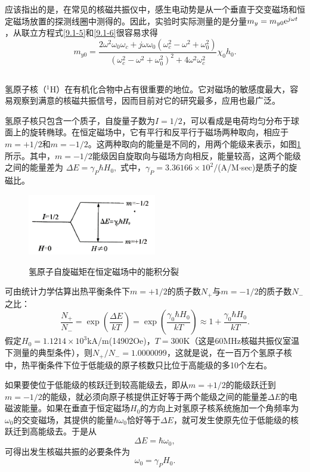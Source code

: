 \documentclass[a4paper]{article}
\begin{document}
应该指出的是，在常见的核磁共振仪中，感生电动势是从一个垂直于交变磁场和恒定磁场放置的探测线圈中测得的。因此，实验时实际测量的是分量$m_y=m_{y0}{\rm e}^{j\omega t}$，从联立方程式\ref{9.1-5}和\ref{9.1-6}很容易求得
\begin{equation}m_{y0}=\frac{2\omega^2\omega_0\omega_c+j\omega\omega_0(\omega_c^2-\omega^2+\omega_0^2)}{(\omega_c^2-\omega^2+\omega_0^2)^2+4\omega^2\omega_c^2}\chi_0h_0.\label{9.1-12}\end{equation}

\subsection{}
氢原子核（$^1$H）在有机化合物中占有很重要的地位。它对磁场的敏感度最大，容易观察到满意的核磁共振信号，因而目前对它的研究最多，应用也最广泛。

氢原子核只包含一个质子，自旋量子数为$I=1/2$，可以看成是电荷均匀分布于球面上的旋转椭球。在恒定磁场中，它有平行和反平行于磁场两种取向，相应于$m=+1/2$和$m=-1/2$。这两种取向的能量是不同的，用两个能级来表示，如图\ref{Fig2}所示。其中，$m=-1/2$能级因自旋取向与磁场方向相反，能量较高，这两个能级之间的能量差为
$\Delta E=\gamma_P\hbar H_0,$
式中，$\gamma_P=3.36166\times 10^2/$(A/M$\cdot$sec)是质子的旋磁比。

\begin{figure}[H]
\centering
\includegraphics[width = 0.5\textwidth]{fig/2.png}\\
\caption{氢原子自旋磁矩在恒定磁场中的能积分裂}
\label{Fig2}
\end{figure}

可由统计力学估算出热平衡条件下$m=+1/2$的质子数$N_+$与$m=-1/2$的质子数$N_-$之比：
\begin{equation}\frac{N_+}{N_-}=\exp\left(\frac{\Delta E}{kT}\right)=\exp\left(\frac{\gamma_0\hbar H_0}{kT}\right)\approx 1+\frac{\gamma_0 \hbar H_0}{kT}.\label{9.1-13}\end{equation}
假定$H_0=1.1214\times 10^3$kA/m(14902Oe)，$T=300$K（这是60MHz核磁共振仪室温下测量的典型条件），则$N_+/N_-=1.0000099$，这就是说，在一百万个氢原子核中，热平衡条件下位于低能级的原子核数只比位于高能级的多10个左右。

如果要使位于低能级的核跃迁到较高能级去，即从$m=+1/2$的能级跃迁到$m=-1/2$的能级，就必须向原子核提供正好等于两个能级之间的能量差$\Delta E$的电磁波能量。如果在垂直于恒定磁场$H_0$的方向上对氢原子核系统施加一个角频率为$\omega_0$的交变磁场，其提供的能量$\hbar\omega_0$恰好等于$\Delta E$，就可发生使原先位于低能级的核跃迁到高能级去。于是从
$$\Delta E=\hbar\omega_0,$$
可得出发生核磁共振的必要条件为
\begin{equation}\omega_0=\gamma_PH_0.\label{9.1-14}\end{equation}
\end{document}
